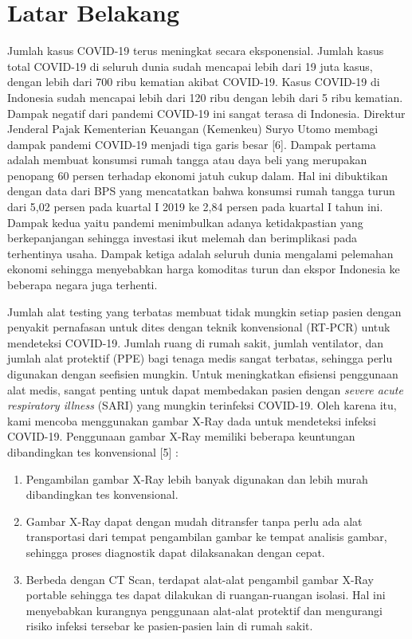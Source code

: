 \documentclass{article}
\begin{document}

  \newpage

  \section{Latar Belakang}
   Jumlah kasus COVID-19 terus meningkat secara eksponensial. Jumlah kasus total COVID-19 di seluruh dunia sudah mencapai lebih dari 19 juta kasus, dengan lebih dari 700 ribu kematian akibat COVID-19. Kasus COVID-19 di Indonesia sudah mencapai lebih dari 120 ribu dengan lebih dari 5 ribu kematian. Dampak negatif dari pandemi COVID-19 ini sangat terasa di Indonesia. Direktur Jenderal Pajak Kementerian Keuangan (Kemenkeu) Suryo Utomo membagi dampak pandemi COVID-19 menjadi tiga garis besar [6]. Dampak pertama adalah membuat konsumsi rumah tangga atau daya beli yang merupakan penopang 60 persen terhadap ekonomi jatuh cukup dalam. Hal ini dibuktikan dengan data dari BPS yang mencatatkan bahwa konsumsi rumah tangga turun dari 5,02 persen pada kuartal I 2019 ke 2,84 persen pada kuartal I tahun ini. Dampak kedua yaitu pandemi menimbulkan adanya ketidakpastian yang berkepanjangan sehingga investasi ikut melemah dan berimplikasi pada terhentinya usaha. Dampak ketiga adalah seluruh dunia mengalami pelemahan ekonomi sehingga menyebabkan harga komoditas turun dan ekspor Indonesia ke beberapa negara juga terhenti. \par
   Jumlah alat testing yang terbatas membuat tidak mungkin setiap pasien dengan penyakit pernafasan untuk dites dengan teknik konvensional (RT-PCR) untuk mendeteksi COVID-19. Jumlah ruang di rumah sakit, jumlah ventilator, dan jumlah alat protektif (PPE) bagi tenaga medis sangat terbatas, sehingga perlu digunakan dengan seefisien mungkin. Untuk meningkatkan efisiensi penggunaan alat medis, sangat penting untuk dapat membedakan pasien dengan \textit{severe acute respiratory illness} (SARI) yang mungkin terinfeksi COVID-19. Oleh karena itu, kami mencoba menggunakan gambar X-Ray dada untuk mendeteksi infeksi COVID-19.
   Penggunaan gambar X-Ray memiliki beberapa keuntungan dibandingkan tes konvensional [5] :
   
   \begin{enumerate}
   	\item Pengambilan gambar X-Ray lebih banyak digunakan dan lebih murah dibandingkan tes konvensional.
   	\item Gambar X-Ray dapat dengan mudah ditransfer tanpa perlu ada alat transportasi dari tempat pengambilan gambar ke tempat analisis gambar, sehingga proses diagnostik dapat dilaksanakan dengan cepat.
   	\item Berbeda dengan CT Scan, terdapat alat-alat pengambil gambar X-Ray portable sehingga tes dapat dilakukan di ruangan-ruangan isolasi. Hal ini menyebabkan kurangnya penggunaan alat-alat protektif dan mengurangi risiko infeksi tersebar ke pasien-pasien lain di rumah sakit.
   \end{enumerate}
 
\end{document}
